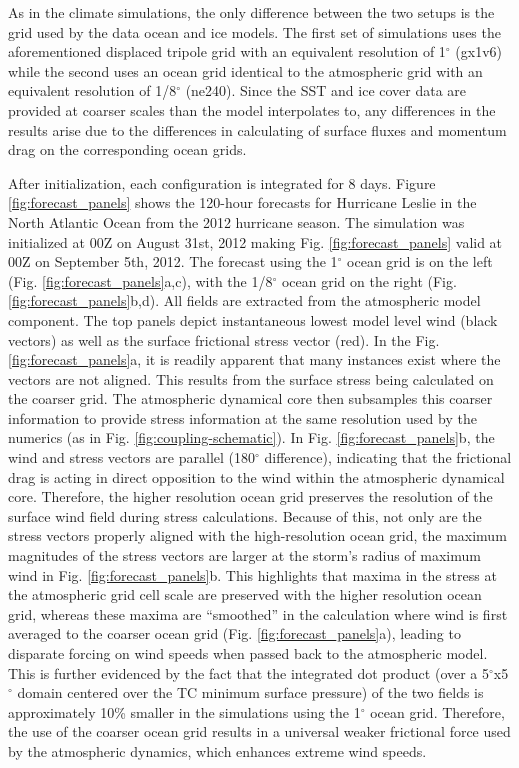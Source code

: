 \documentclass[draft,ms]{AGUTeX}
\newcommand{\degree}{$^{\circ}$}
\begin{document}
\begin{article}
As in the climate simulations, the only difference between the two setups is the grid used by the data ocean and ice models. The first set of simulations uses the aforementioned displaced tripole grid with an equivalent resolution of 1\degree{} (gx1v6) while the second uses an ocean grid identical to the atmospheric grid with an equivalent resolution of 1/8\degree{} (ne240). Since the SST and ice cover data are provided at coarser scales than the model interpolates to, any differences in the results arise due to the differences in calculating of surface fluxes and momentum drag on the corresponding ocean grids.

After initialization, each configuration is integrated for 8 days. Figure \ref{fig:forecast_panels} shows the 120-hour forecasts for Hurricane Leslie in the North Atlantic Ocean from the 2012 hurricane season. The simulation was initialized at 00Z on August 31st, 2012 making Fig. \ref{fig:forecast_panels} valid at 00Z on September 5th, 2012. The forecast using the 1\degree{} ocean grid is on the left (Fig. \ref{fig:forecast_panels}a,c), with the 1/8\degree{} ocean grid on the right (Fig. \ref{fig:forecast_panels}b,d). All fields are extracted from the atmospheric model component. The top panels depict instantaneous lowest model level wind (black vectors) as well as the surface frictional stress vector (red). In the Fig. \ref{fig:forecast_panels}a, it is readily apparent that many instances exist where the vectors are not aligned. This results from the surface stress being calculated on the coarser grid. The atmospheric dynamical core then subsamples this coarser information to provide stress information at the same resolution used by the numerics (as in Fig. \ref{fig:coupling-schematic}). In Fig. \ref{fig:forecast_panels}b, the wind and stress vectors are parallel (180\degree{} difference), indicating that the frictional drag is acting in direct opposition to the wind within the atmospheric dynamical core. Therefore, the higher resolution ocean grid preserves the resolution of the surface wind field during stress calculations. Because of this, not only are the stress vectors properly aligned with the high-resolution ocean grid, the maximum magnitudes of the stress vectors are larger at the storm's radius of maximum wind in Fig. \ref{fig:forecast_panels}b. This highlights that maxima in the stress at the atmospheric grid cell scale are preserved with the higher resolution ocean grid, whereas these maxima are ``smoothed'' in the calculation where wind is first averaged to the coarser ocean grid (Fig. \ref{fig:forecast_panels}a), leading to disparate forcing on wind speeds when passed back to the atmospheric model. This is further evidenced by the fact that the integrated dot product (over a 5\degree{}x5\degree{} domain centered over the TC minimum surface pressure) of the two fields is approximately 10\% smaller in the simulations using the 1\degree{} ocean grid. Therefore, the use of the coarser ocean grid results in a universal weaker frictional force used by the atmospheric dynamics, which enhances extreme wind speeds.


\end{article}
\end{document}

